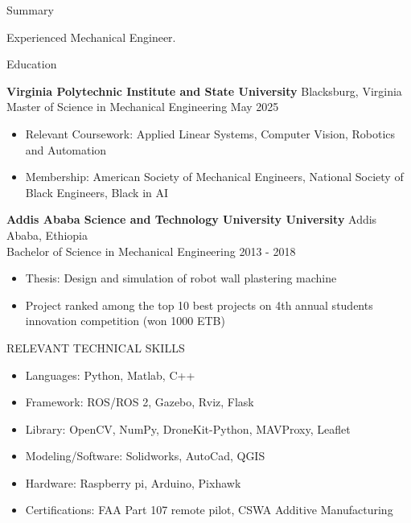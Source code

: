 \documentclass{resume} %
\begin{document}

\begin{rSection}{Summary}

{Experienced Mechanical Engineer.}


\end{rSection}

\begin{rSection}{Education}

\textbf{Virginia Polytechnic Institute and State University} \hfill Blacksburg, Virginia \\
Master of Science in Mechanical Engineering \hfill May 2025 

\begin{itemize}

\item  Relevant Coursework: Applied Linear Systems, Computer Vision, Robotics and Automation
\item  Membership: American Society of Mechanical Engineers, National Society of Black Engineers, Black in AI
\end{itemize}

\textbf{Addis Ababa Science and Technology University University} \hfill Addis Ababa, Ethiopia \\
Bachelor of Science in Mechanical Engineering \hfill 2013 - 2018
\begin{itemize}
\item Thesis: Design and simulation of robot wall plastering machine
\item Project ranked among the top 10 best projects on 4th annual students innovation competition (won 1000 ETB)
\end{itemize}

\end{rSection}

\begin{rSection}{RELEVANT TECHNICAL SKILLS}
\begin{itemize}
\item Languages: Python, Matlab, C++
\item Framework: ROS/ROS 2, Gazebo, Rviz, Flask
\item Library: OpenCV, NumPy, DroneKit-Python, MAVProxy, Leaflet
\item Modeling/Software: Solidworks, AutoCad, QGIS
\item Hardware: Raspberry pi, Arduino, Pixhawk
\item Certifications: FAA Part 107 remote pilot, CSWA Additive Manufacturing

\end{itemize}
\end{rSection}
\end{document}
